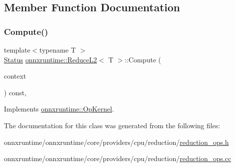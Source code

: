 \subsection{Member Function Documentation}
\mbox{\label{classonnxruntime_1_1ReduceL2_a76783ef262527c9b2b03254f30331df6}} 
\subsubsection{\texorpdfstring{Compute()}{Compute()}}
{\footnotesize\ttfamily template$<$typename T $>$ \\
\mbox{\hyperlink{classonnxruntime_1_1common_1_1Status}{Status}} \mbox{\hyperlink{classonnxruntime_1_1ReduceL2}{onnxruntime\+::\+Reduce\+L2}}$<$ T $>$\+::Compute (\begin{DoxyParamCaption}\item[{\mbox{\hyperlink{classonnxruntime_1_1OpKernelContext}{Op\+Kernel\+Context}} $\ast$}]{context }\end{DoxyParamCaption}) const\hspace{0.3cm}{\ttfamily [override]}, {\ttfamily [virtual]}}



Implements \mbox{\hyperlink{classonnxruntime_1_1OpKernel_a9eca8656a78b1b3ab9d3351a12798650}{onnxruntime\+::\+Op\+Kernel}}.



The documentation for this class was generated from the following files\+:\begin{DoxyCompactItemize}
\item 
onnxruntime/onnxruntime/core/providers/cpu/reduction/\mbox{\hyperlink{cpu_2reduction_2reduction__ops_8h}{reduction\+\_\+ops.\+h}}\item 
onnxruntime/onnxruntime/core/providers/cpu/reduction/\mbox{\hyperlink{cpu_2reduction_2reduction__ops_8cc}{reduction\+\_\+ops.\+cc}}\end{DoxyCompactItemize}
